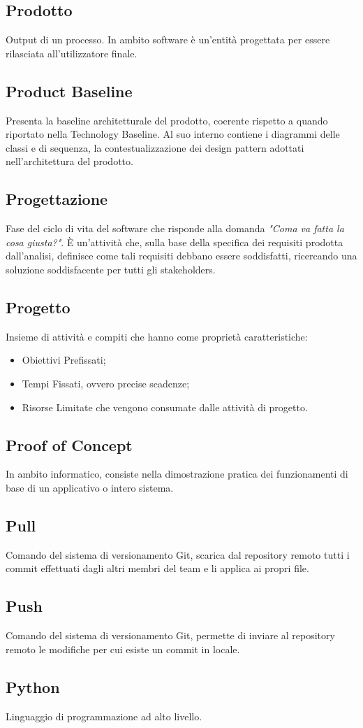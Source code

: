 \subsection{Prodotto}
Output di un processo. In ambito software è un'entità progettata per essere rilasciata all'utilizzatore finale.

\subsection{Product Baseline}
Presenta la baseline architetturale del prodotto, coerente rispetto a quando riportato nella Technology Baseline. Al suo interno contiene i diagrammi delle classi e di sequenza, la contestualizzazione dei design pattern adottati nell'architettura del prodotto.

\subsection{Progettazione}
Fase del ciclo di vita del software che risponde alla domanda \textit{"Coma va fatta la cosa giusta?"}. È un'attività che, sulla base della specifica dei requisiti prodotta dall'analisi, definisce come tali requisiti debbano essere soddisfatti, ricercando una soluzione soddisfacente per tutti gli stakeholders.

\subsection{Progetto}
Insieme di attività e compiti che hanno come proprietà caratteristiche:
\begin{itemize}
	\item Obiettivi Prefissati;
	\item Tempi Fissati, ovvero precise scadenze;
	\item Risorse Limitate che vengono consumate dalle attività di progetto.
\end{itemize}

\subsection{Proof of Concept}
In ambito informatico, consiste nella dimostrazione pratica dei funzionamenti di base di un applicativo o intero sistema.

\subsection{Pull}
Comando del sistema di versionamento Git, scarica dal repository remoto tutti i commit effettuati dagli altri membri del team e li applica ai propri file.

\subsection{Push}
Comando del sistema di versionamento Git, permette di inviare al repository remoto le modifiche per cui esiste un commit in locale.

\subsection{Python}
Linguaggio di programmazione ad alto livello.